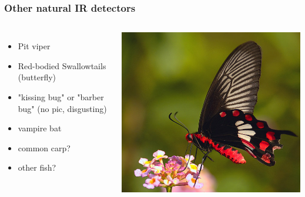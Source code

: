 \documentclass[14pt]{beamer}
\begin{document}
\appendix

\begin{frame}
\frametitle{Other natural IR detectors}
\begin{columns}
\begin{itemize}
\item Pit viper 
\item Red-bodied Swallowtails (butterfly)
\item "kissing bug" or "barber bug" (no pic, disgusting)
\item vampire bat
\item common carp?
\item other fish?
\end{itemize}
\includegraphics[width=\textwidth]{2005-common-rose.jpg}
\end{columns}
\end{frame}

\end{document}
